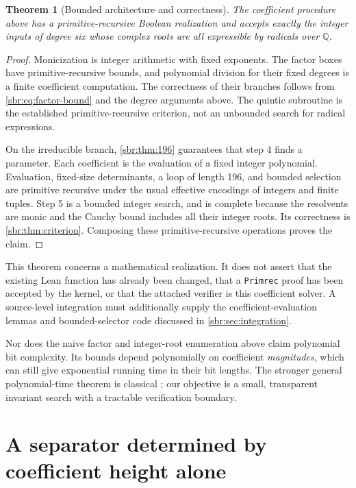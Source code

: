 \documentclass[11pt,letterpaper]{article}
\numberwithin{equation}{section}
\newtheorem{theorem}{Theorem}[section]
\theoremstyle{definition}
\theoremstyle{remark}
\newcommand{\QQ}{\mathbb Q}
\newcommand{\src}[1]{\texttt{\nolinkurl{#1}}}
\begin{document}
\begin{theorem}[Bounded architecture and correctness]
\label{sbr:thm:primrec}
The coefficient procedure above has a primitive-recursive Boolean
realization and accepts exactly the integer inputs of degree six whose
complex roots are all expressible by radicals over $\QQ$.
\end{theorem}
\begin{proof}
Monicization is integer arithmetic with fixed exponents. The factor boxes
have primitive-recursive bounds, and polynomial division for their fixed
degrees is a finite coefficient computation. The correctness of their
branches follows from \cref{sbr:eq:factor-bound} and the degree arguments
above. The quintic subroutine is the established primitive-recursive
criterion, not an unbounded search for radical expressions.

On the irreducible branch, \cref{sbr:thm:196} guarantees that step 4 finds a
parameter. Each coefficient is the evaluation of a fixed integer
polynomial. Evaluation, fixed-size determinants, a loop of length 196,
and bounded selection are primitive recursive under the usual effective
encodings of integers and finite tuples. Step 5 is a bounded integer
search, and is complete because the resolvents are monic and the Cauchy
bound includes all their integer roots. Its correctness is
\cref{sbr:thm:criterion}. Composing these primitive-recursive operations proves
the claim.
\end{proof}

This theorem concerns a mathematical realization. It does not assert that
the existing Lean function has already been changed, that a \src{Primrec}
proof has been accepted by the kernel, or that the attached verifier is
this coefficient solver. A source-level integration must additionally
supply the coefficient-evaluation lemmas and bounded-selector code
discussed in \cref{sbr:sec:integration}.

Nor does the naive factor and integer-root enumeration above claim
polynomial bit complexity. Its bounds depend polynomially on coefficient
\emph{magnitudes}, which can still give exponential running time in their
bit lengths. The stronger general polynomial-time theorem is classical
\cite{landau-miller}; our objective is a small, transparent invariant
search with a tractable verification boundary.

\section{A separator determined by coefficient height alone}
\label{sbr:sec:height}
\end{document}

